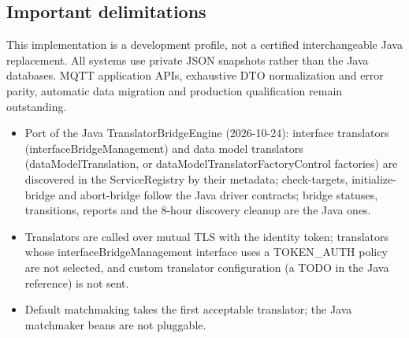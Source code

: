 \documentclass[a4paper]{arrowhead}
\begin{document}
\subsection{Important delimitations}
This implementation is a development profile, not a certified interchangeable Java replacement. All systems use private JSON snapshots rather than the Java databases. MQTT application APIs, exhaustive DTO normalization and error parity, automatic data migration and production qualification remain outstanding.
\begin{itemize}
\item Port of the Java TranslatorBridgeEngine (2026-10-24): interface translators (interfaceBridgeManagement) and data model translators (dataModelTranslation, or dataModelTranslatorFactoryControl factories) are discovered in the ServiceRegistry by their metadata; check-targets, initialize-bridge and abort-bridge follow the Java driver contracts; bridge statuses, transitions, reports and the 8-hour discovery cleanup are the Java ones.
\item Translators are called over mutual TLS with the identity token; translators whose interfaceBridgeManagement interface uses a TOKEN\_AUTH policy are not selected, and custom translator configuration (a TODO in the Java reference) is not sent.
\item Default matchmaking takes the first acceptable translator; the Java matchmaker beans are not pluggable.
\end{itemize}
\end{document}

